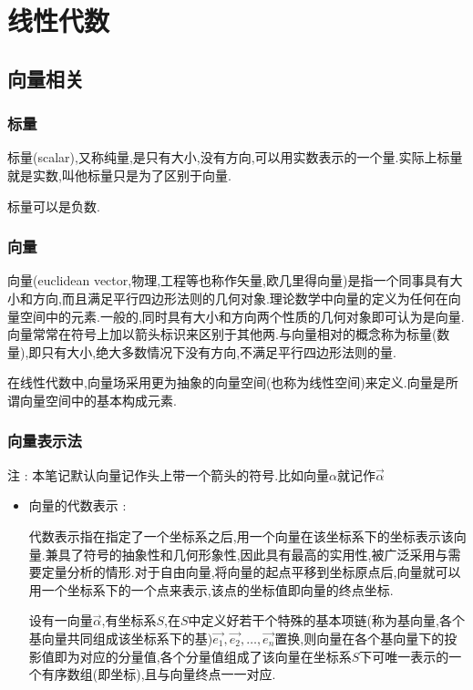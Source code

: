 \section{线性代数}{

  \subsection{向量相关}{

      \subsubsection{标量}{
          标量(scalar),又称纯量,是只有大小,没有方向,可以用实数表示的一个量.实际上标量就是实数,叫他标量只是为了区别于向量.

          标量可以是负数.
      }%

      \subsubsection{向量}{
          向量(euclidean vector,物理,工程等也称作矢量,欧几里得向量)是指一个同事具有大小和方向,而且满足平行四边形法则的几何对象.理论数学中向量的定义为任何在向量空间中的元素.一般的,同时具有大小和方向两个性质的几何对象即可认为是向量.向量常常在符号上加以箭头标识来区别于其他两.与向量相对的概念称为标量(数量),即只有大小,绝大多数情况下没有方向,不满足平行四边形法则的量.

          在线性代数中,向量场采用更为抽象的向量空间(也称为线性空间)来定义.向量是所谓向量空间中的基本构成元素.
      }%

      \subsubsection{向量表示法}{
          注 : 本笔记默认向量记作头上带一个箭头的符号.比如向量$\alpha$就记作$\vec{\alpha}$

          \begin{itemize}
              \item {
                    向量的代数表示 :

                    代数表示指在指定了一个坐标系之后,用一个向量在该坐标系下的坐标表示该向量.兼具了符号的抽象性和几何形象性,因此具有最高的实用性,被广泛采用与需要定量分析的情形.对于自由向量,将向量的起点平移到坐标原点后,向量就可以用一个坐标系下的一个点来表示,该点的坐标值即向量的终点坐标.

                    设有一向量$\vec{\alpha}$,有坐标系$S$,在$S$中定义好若干个特殊的基本项链(称为基向量,各个基向量共同组成该坐标系下的基)$\vec{e_1},\vec{e_2},\dots,\vec{e_n}$置换,则向量在各个基向量下的投影值即为对应的分量值,各个分量值组成了该向量在坐标系$S$下可唯一表示的一个有序数组(即坐标),且与向量终点一一对应.

}
\end{itemize}}}}
